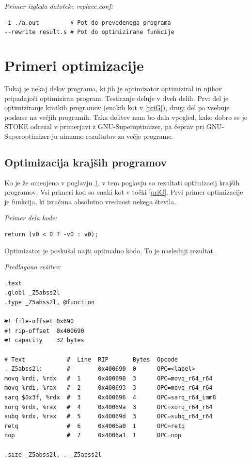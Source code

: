 \documentclass[a4paper, 12pt]{book}
\begin{document}
\noindent
{\it Primer izgleda datoteke replace.conf:}
\begin{Verbatim}[baselinestretch=1]
-i ./a.out         # Pot do prevedenega programa
--rewrite result.s # Pot do optimizirane funkcije
\end{Verbatim}
\section{Primeri optimizacije}
\label{priG2}
Tukaj je nekaj delov programa, ki jih je optimizator optimiziral in njihov pripadajoči optimiziran program. Testiranje deluje v dveh delih. Prvi del je optimiziranje kratkih programov (enakih kot v \ref{priG}), drugi del pa vsebuje poskuse na večjih programih. Taka delitev nam bo dala vpogled, kako dobro se je STOKE odrezal v primerjavi z GNU-Superoptimizer, pa čeprav pri GNU-Superoptimizer-ju nimamo rezultatov za večje programe.  
\subsection{Optimizacija krajših programov}
Ko je že omenjeno v poglavju \ref{priG2}, v tem poglavju so rezultati optimizacij krajših programov. Vsi primeri kod so enaki kot v točki \ref{priG}. Prvi primer optimizacije je funkcija, ki izračuna absolutno vrednost nekega števila. 
\medskip

\noindent
{\it Primer dela kode:}
\begin{Verbatim}[baselinestretch=1]
return (v0 < 0 ? -v0 : v0);
\end{Verbatim}

Optimizator je poskušal najti optimalno kodo. To je naslednji rezultat. 
\medskip

\noindent
{\it Predlagana rešitev:}
\begin{Verbatim}[baselinestretch=1]
.text
.globl _Z5abss2l
.type _Z5abss2l, @function

#! file-offset 0x690
#! rip-offset  0x400690
#! capacity    32 bytes

# Text            #  Line  RIP       Bytes  Opcode             
._Z5abss2l:       #        0x400690  0      OPC=<label>        
movq %rdi, %rdx   #  1     0x400690  3      OPC=movq_r64_r64   
movq %rdi, %rax   #  2     0x400693  3      OPC=movq_r64_r64   
sarq $0x3f, %rdx  #  3     0x400696  4      OPC=sarq_r64_imm8  
xorq %rdx, %rax   #  4     0x40069a  3      OPC=xorq_r64_r64   
subq %rdx, %rax   #  5     0x40069d  3      OPC=subq_r64_r64   
retq              #  6     0x4006a0  1      OPC=retq           
nop               #  7     0x4006a1  1      OPC=nop                       

.size _Z5abss2l, .-_Z5abss2l
\end{Verbatim}
\end{document}
